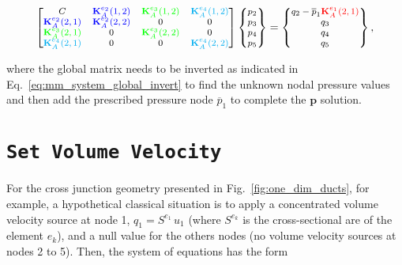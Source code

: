 \documentclass[12pt]{article}
\begin{document}
\begin{itemize}
	\begin{equation} \label{eq:global_mobility_matrix_BC2}
		\footnotesize
		\begin{bmatrix}
			C & \textcolor{blue}{\mathbf{K}_{A}^{e_2}(1,2)} & \textcolor{green}{\mathbf{K}_{A}^{e_3}(1,2)} & \textcolor{cyan}{\mathbf{K}_{A}^{e_4}(1,2)} \\
			\textcolor{blue}{\mathbf{K}_{A}^{e_2}(2,1)}   &   \textcolor{blue}{\mathbf{K}_{A}^{e_2}(2,2)}   & 0 & 0 \\
			\textcolor{green}{\mathbf{K}_{A}^{e_3}(2,1)}   &   0   &  \textcolor{green}{\mathbf{K}_{A}^{e_3}(2,2)}  &   0 \\
			\textcolor{cyan}{\mathbf{K}_{A}^{e_4}(2,1)}   &   0   &   0   &   \textcolor{cyan}{\mathbf{K}_{A}^{e_4}(2,2)}
		\end{bmatrix}
		\begin{Bmatrix}
			p_2 \\
			p_3 \\
			p_4 \\
			p_5 \\
		\end{Bmatrix}
		=
		\begin{Bmatrix}
			q_2	- \overline{p}_1  \textcolor{red}{\mathbf{K}_{A}^{e_1}(2,1)} \\
			q_3 \\
			q_4 \\
			q_5 \\
		\end{Bmatrix},
	\end{equation}
\end{itemize}

\noindent where the global matrix needs to be inverted as indicated in Eq.~\ref{eq:mm_system_global_invert} to find the unknown nodal pressure values and then add the prescribed pressure node $\overline{p}_1$ to complete the $\mathbf{p}$ solution.

\section{\texttt{Set Volume Velocity}} \label{sec:bc_vol_vel}

For the cross junction geometry presented in Fig.~\ref{fig:one_dim_ducts}, for example, a hypothetical classical situation is to apply a concentrated volume velocity source at node 1, $q_1=S^{e_1} \, u_1$ (where $S^{e_k}$ is the cross-sectional are of the element $e_k$), and a null value for the others nodes (no volume velocity sources at nodes 2 to 5). Then, the system of equations has the form
\end{document}

